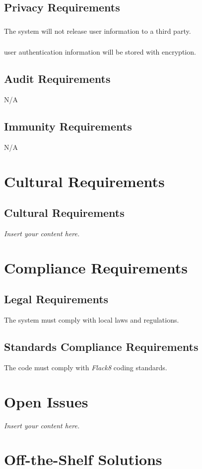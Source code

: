 \documentclass[12pt]{article}
\newcommand{\lips}{\textit{Insert your content here.}}
\begin{document}
\subsection{Privacy Requirements}
\subsubsection{}
The system will not release user information to a third party.
\subsubsection{}
user authentication information will be stored with encryption.
\subsection{Audit Requirements}
N/A
\subsection{Immunity Requirements}
N/A

\section{Cultural Requirements}
\subsection{Cultural Requirements}
\lips

\section{Compliance Requirements}
\subsection{Legal Requirements}
The system must comply with local laws and regulations.
\subsection{Standards Compliance Requirements}
The code must comply with \textit{Flack8} coding standards.

\section{Open Issues}
\lips

\section{Off-the-Shelf Solutions}
\end{document}
